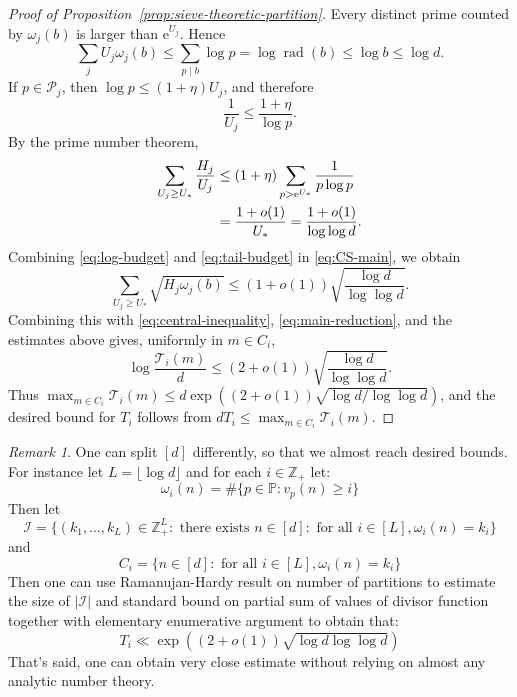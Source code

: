 \documentclass[11pt]{amsart}
\theoremstyle{remark}
\newtheorem{rmk}{Remark}
\begin{document}
\begin{proof}[Proof of Proposition~\ref{prop:sieve-theoretic-partition}]
Every distinct prime counted by $\omega_j(b)$ is larger than $\mathrm e^{U_j}$. Hence
\begin{equation}\label{eq:log-budget}
 \sum_jU_j\omega_j(b)
 \le\sum_{p\mid b}\log p
 =\log\operatorname{rad}(b)
 \le\log b
 \le \log d.
\end{equation}
If $p\in\mathcal P_j$, then $\log p\le(1+\eta)U_j$, and therefore
\[
 \frac1{U_j}\le\frac{1+\eta}{\log p}.
\]
By the prime number theorem,
\begin{align}
 \sum_{U_j\ge U_*}\frac{H_j}{U_j}
 &\le(1+\eta)\sum_{p>\mathrm e^{U_*}}\frac1{p\log p}\notag\\
 &=\frac{1+o(1)}{U_*}
 =\frac{1+o(1)}{\log \log d}.
\label{eq:tail-budget}
\end{align}
Combining \eqref{eq:log-budget} and \eqref{eq:tail-budget} in
\eqref{eq:CS-main}, we obtain
\begin{equation}
 \sum_{U_j\ge U_*}\sqrt{H_j\omega_j(b)}
 \le(1+o(1))\sqrt{\frac{\log d}{\log \log d}}.
\end{equation}
Combining this with \eqref{eq:central-inequality}, \eqref{eq:main-reduction}, and the estimates above gives, uniformly in $m\in C_i$,
\[
  \log\frac{\mathcal T_i(m)}d
  \leq (2+o(1))\sqrt{\frac{\log d}{\log\log d}}.
\]
Thus $\max_{m\in C_i}\mathcal T_i(m)\leq d\exp((2+o(1))\sqrt{\log d/\log\log d})$, and the desired bound for $T_i$ follows from $dT_i\leq \max_{m\in C_i}\mathcal T_i(m)$.
\end{proof}

\begin{rmk}
  One can split $[d]$ differently, so that we almost reach desired bounds. For instance let $L = \lfloor \log d \rfloor$ and for each $i \in \mathbb{Z}_+$ let:
  \begin{equation}
    \omega_i(n) = \# \{p \in \mathbb{P} : v_p(n) \geq i \}
  \end{equation}
  Then let
  \begin{equation}
    \mathcal{I} = \{ (k_1, \ldots, k_L) \in \mathbb{Z}_{+}^L : \text{ there exists } n \in [d] : \text{ for all } i \in [L], \omega_i(n) = k_i \}
  \end{equation}
  and
  \begin{equation}
    C_i = \{ n \in [d] : \text{ for all } i \in [L], \omega_i(n) = k_i \}
  \end{equation}
  Then one can use Ramanujan-Hardy result on number of partitions to estimate the size of $|\mathcal{I}|$ and standard bound on partial sum of values of divisor function together with elementary enumerative argument to obtain that:
  \begin{equation}
    T_i \ll \exp((2 + o(1)) \sqrt{\log d \log \log d})
  \end{equation}
  That's said, one can obtain very close estimate without relying on almost any analytic number theory.
\end{rmk}
\end{document}
